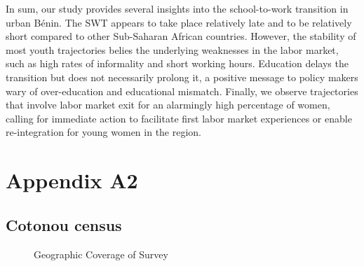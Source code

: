 \documentclass[
  a4paper, twoside, 12pt]{book}
\begin{document}
In sum, our study provides several insights into the school-to-work transition in urban Bénin. The SWT appears to take place relatively late and to be relatively short compared to other Sub-Saharan African countries. However, the stability of most youth trajectories belies the underlying weaknesses in the labor market, such as high rates of informality and short working hours. Education delays the transition but does not necessarily prolong it, a positive message to policy makers wary of over-education and educational mismatch. Finally, we observe trajectories that involve labor market exit for an alarmingly high percentage of women, calling for immediate action to facilitate first labor market experiences or enable re-integration for young women in the region.

\newpage
{}
\printbibliography[segment=\therefsegment,heading=subbibintoc,title={References}]

\newpage

\setcounter{figure}{0}
\renewcommand{\thefigure}{A2.\arabic{figure}}
\setcounter{table}{0}
\renewcommand{\thetable}{A2.\arabic{table}}
\setcounter{section}{0}
\renewcommand{\thesection}{\Alph{section}2}
\renewcommand{\thesubsection}{A2.\arabic{subsection}}

\hypertarget{survey-appendix-a}{%
\section*{Appendix A2}\label{survey-appendix-a}}


\hypertarget{survey-census}{%
\subsection*{Cotonou census}\label{survey-census}}


\begin{figure}[H] \caption{\label{fig:litt} Geographic Coverage of Survey}
\centering
{}
\end{figure}
\end{document}
